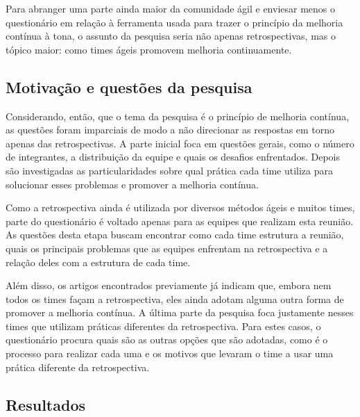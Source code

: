 Para abranger uma parte ainda maior da comunidade ágil e enviesar menos o questionário em relação à ferramenta usada para trazer o princípio da melhoria contínua à tona, o assunto da pesquisa seria não apenas retrospectivas, mas o tópico maior: como times ágeis promovem melhoria continuamente.


\subsection{Motivação e questões da pesquisa}

Considerando, então, que o tema da pesquisa é o princípio de melhoria contínua, as questões foram imparciais de modo a não direcionar as respostas em torno apenas das retrospectivas. A parte inicial foca em questões gerais, como o número de integrantes, a distribuição da equipe e quais os desafios enfrentados. Depois são investigadas as particularidades sobre qual prática cada time utiliza para solucionar esses problemas e promover a melhoria contínua. 

Como a retrospectiva ainda é utilizada por diversos métodos ágeis e muitos times, parte do questionário é voltado apenas para as equipes que realizam esta reunião. As questões desta etapa buscam encontrar como cada time estrutura a reunião, quais os principais problemas que as equipes enfrentam na retrospectiva e a relação deles com a estrutura de cada time. 

Além disso, os artigos encontrados previamente já indicam que, embora nem todos os times façam a retrospectiva, eles ainda adotam alguma outra forma de promover a melhoria contínua. A última parte da pesquisa foca justamente nesses times que utilizam práticas diferentes da retrospectiva. Para estes casos, o questionário procura quais são as outras opções que são adotadas, como é o processo para realizar cada uma e os motivos que levaram o time a usar uma prática diferente da retrospectiva.

\subsection{Resultados}


